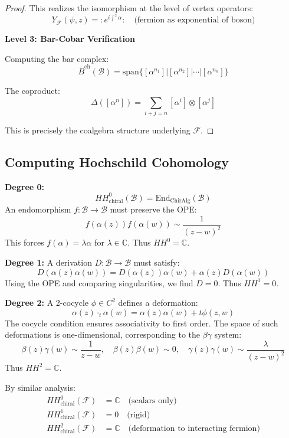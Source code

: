 \begin{proof}
This realizes the isomorphism at the level of vertex operators:
\[
Y_{\mathcal{F}}(\psi, z) = :e^{i\int^z \alpha}: \quad \text{(fermion as exponential of boson)}
\]

\textbf{Level 3: Bar-Cobar Verification}

Computing the bar complex:
\[
\overline{B}^{\text{ch}}(\mathcal{B}) = \text{span}\{[\alpha^{n_1}]|[\alpha^{n_2}]|\cdots|[\alpha^{n_k}]\}
\]

The coproduct:
\[
\Delta([\alpha^n]) = \sum_{i+j=n} [\alpha^i] \otimes [\alpha^j]
\]

This is precisely the coalgebra structure underlying $\mathcal{F}$.
\end{proof}

\subsection{Computing Hochschild Cohomology}

\begin{computation}

\textbf{Degree 0:}
\[
HH^0_{\text{chiral}}(\mathcal{B}) = \text{End}_{\text{ChirAlg}}(\mathcal{B})
\]
An endomorphism $f: \mathcal{B} \to \mathcal{B}$ must preserve the OPE:
\[
f(\alpha(z))f(\alpha(w)) \sim \frac{1}{(z-w)^2}
\]
This forces $f(\alpha) = \lambda \alpha$ for $\lambda \in \mathbb{C}$. Thus $HH^0 = \mathbb{C}$.

\textbf{Degree 1:}
A derivation $D: \mathcal{B} \to \mathcal{B}$ must satisfy:
\[
D(\alpha(z)\alpha(w)) = D(\alpha(z))\alpha(w) + \alpha(z)D(\alpha(w))
\]
Using the OPE and comparing singularities, we find $D = 0$. Thus $HH^1 = 0$.

\textbf{Degree 2:}
A 2-cocycle $\phi \in C^2$ defines a deformation:
\[
\alpha(z) \cdot_t \alpha(w) = \alpha(z)\alpha(w) + t\phi(z,w)
\]
The cocycle condition ensures associativity to first order. The space of such deformations is one-dimensional, corresponding to the $\beta\gamma$ system:
\[
\beta(z)\gamma(w) \sim \frac{1}{z-w}, \quad \beta(z)\beta(w) \sim 0, \quad \gamma(z)\gamma(w) \sim \frac{\lambda}{(z-w)^2}
\]
Thus $HH^2 = \mathbb{C}$.
\end{computation}

\begin{computation}

By similar analysis:
\begin{align}
HH^0_{\text{chiral}}(\mathcal{F}) &= \mathbb{C} \quad \text{(scalars only)} \\
HH^1_{\text{chiral}}(\mathcal{F}) &= 0 \quad \text{(rigid)} \\
HH^2_{\text{chiral}}(\mathcal{F}) &= \mathbb{C} \quad \text{(deformation to interacting fermion)}
\end{align}
\end{computation}

